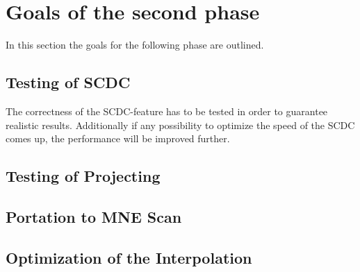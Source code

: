 \section{Goals of the second phase}
In this section the goals for the following phase are outlined. 

\subsection{Testing of SCDC}
The correctness of the SCDC-feature has to be tested in order to guarantee realistic results. Additionally if any possibility to optimize the speed of the SCDC comes up, the performance will be improved further.
\subsection{Testing of Projecting}

\subsection{Portation to MNE Scan}
\subsection{Optimization of the Interpolation}